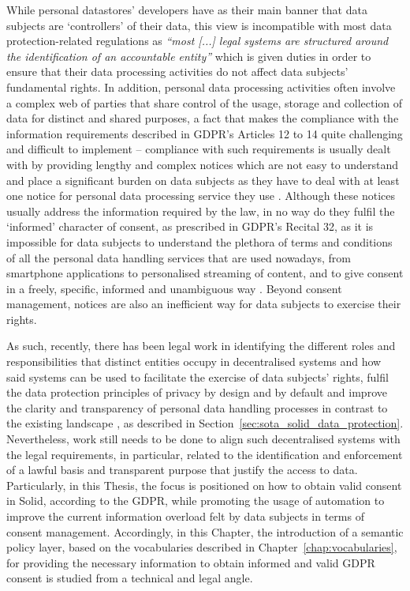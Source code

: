 While personal datastores' developers have as their main banner that data subjects are `controllers' of their data, this view is incompatible with most data protection-related regulations as \textit{``most [...] legal systems are structured around the identification of an accountable entity''} \citep{chomczyk_penedo_selfsovereign_2021} which is given duties in order to ensure that their data processing activities do not affect data subjects' fundamental rights.
In addition, personal data processing activities often involve a complex web of parties that share control of the usage, storage and collection of data for distinct and shared purposes, a fact that makes the compliance with the information requirements described in GDPR's Articles 12 to 14 quite challenging and difficult to implement \citep{lovato_more_2023} -- compliance with such requirements is usually dealt with by providing lengthy and complex notices which are not easy to understand and place a significant burden on data subjects as they have to deal with at least one notice for personal data processing service they use \citep{terpstra_improving_2019,linden_privacy_2020}.
Although these notices usually address the information required by the law, in no way do they fulfil the `informed' character of consent, as prescribed in GDPR's Recital 32, as it is impossible for data subjects to understand the plethora of terms and conditions of all the personal data handling services that are used nowadays, from smartphone applications to personalised streaming of content, and to give consent in a freely, specific, informed and unambiguous way \citep{mohan_analyzing_2019}.
Beyond consent management, notices are also an inefficient way for data subjects to exercise their rights.

As such, recently, there has been legal work in identifying the different roles and responsibilities that distinct entities occupy in decentralised systems and how said systems can be used to facilitate the exercise of data subjects' rights, fulfil the data protection principles of privacy by design and by default and improve the clarity and transparency of personal data handling processes in contrast to the existing landscape \citep{janssen_personal_2020}, as described in Section~\ref{sec:sota_solid_data_protection}.
Nevertheless, work still needs to be done to align such decentralised systems with the legal requirements, in particular, related to the identification and enforcement of a lawful basis and transparent purpose that justify the access to data.  
Particularly, in this Thesis, the focus is positioned on how to obtain valid consent in Solid, according to the GDPR, while promoting the usage of automation to improve the current information overload felt by data subjects in terms of consent management.
Accordingly, in this Chapter, the introduction of a semantic policy layer, based on the vocabularies described in Chapter~\ref{chap:vocabularies}, for providing the necessary information to obtain informed and valid GDPR consent is studied from a technical and legal angle.


